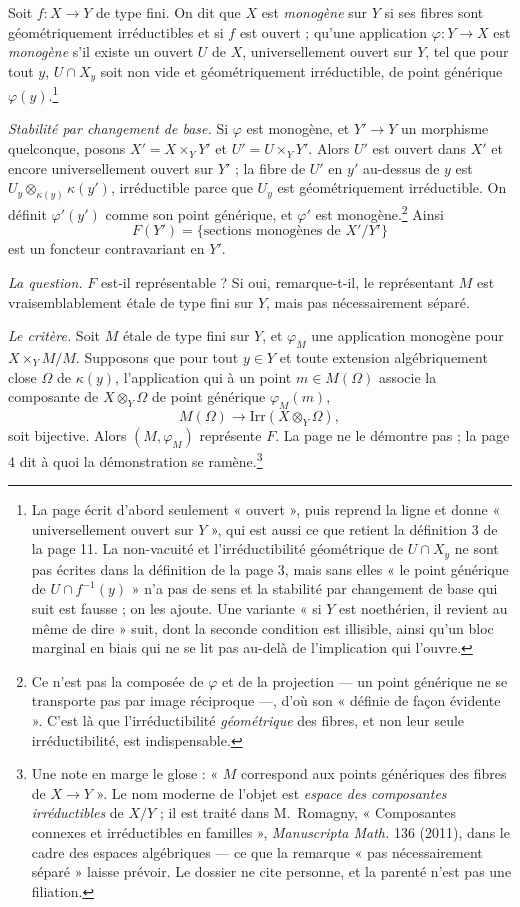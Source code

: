 \documentclass[11pt,a4paper]{article}
\begin{document}
Soit $f : X \to Y$ de type fini. On dit que $X$ est \emph{monogène} sur $Y$ si
ses fibres sont géométriquement irréductibles et si $f$ est ouvert ; qu'une
application $\varphi : Y \to X$ est \emph{monogène} s'il existe un ouvert $U$
de $X$, universellement ouvert sur $Y$, tel que pour tout $y$, $U \cap X_y$
soit non vide et géométriquement irréductible, de point générique
$\varphi(y)$.\footnote{La page écrit d'abord seulement « ouvert », puis reprend
la ligne et donne « universellement ouvert sur $Y$ », qui est aussi ce que
retient la définition 3 de la page 11. La non-vacuité et l'irréductibilité
géométrique de $U \cap X_y$ ne sont pas écrites dans la définition de la page
3, mais sans elles « le point générique de $U \cap f^{-1}(y)$ » n'a pas de sens
et la stabilité par changement de base qui suit est fausse ; on les ajoute.
Une variante « si $Y$ est noethérien, il revient au même de dire » suit, dont
la seconde condition est illisible, ainsi qu'un bloc marginal en biais qui ne
se lit pas au-delà de l'implication qui l'ouvre.}

\emph{Stabilité par changement de base.} Si $\varphi$ est monogène, et
$Y' \to Y$ un morphisme quelconque, posons $X' = X \times_Y Y'$ et
$U' = U \times_Y Y'$. Alors $U'$ est ouvert dans $X'$ et encore universellement
ouvert sur $Y'$ ; la fibre de $U'$ en $y'$ au-dessus de $y$ est
$U_y \otimes_{\kappa(y)} \kappa(y')$, irréductible parce que $U_y$ est
géométriquement irréductible. On définit $\varphi'(y')$ comme son point
générique, et $\varphi'$ est monogène.\footnote{Ce n'est pas la composée de
$\varphi$ et de la projection --- un point générique ne se transporte pas par
image réciproque ---, d'où son « définie de façon évidente ». C'est là que
l'irréductibilité \emph{géométrique} des fibres, et non leur seule
irréductibilité, est indispensable.} Ainsi
\[
  F(Y') = \{\text{sections monogènes de } X' / Y'\}
\]
est un foncteur contravariant en $Y'$.

\emph{La question.} $F$ est-il représentable ? Si oui, remarque-t-il, le
représentant $M$ est vraisemblablement étale de type fini sur $Y$, mais pas
nécessairement séparé.

\emph{Le critère.} Soit $M$ étale de type fini sur $Y$, et $\varphi_M$ une
application monogène pour $X \times_Y M / M$. Supposons que pour tout $y \in Y$
et toute extension algébriquement close $\Omega$ de $\kappa(y)$, l'application
qui à un point $m \in M(\Omega)$ associe la composante de $X \otimes_Y \Omega$
de point générique $\varphi_M(m)$,
\[
  M(\Omega) \longrightarrow \mathrm{Irr}(X \otimes_Y \Omega),
\]
soit bijective. Alors $(M, \varphi_M)$ représente $F$. La page ne le démontre
pas ; la page 4 dit à quoi la démonstration se ramène.\footnote{Une note en
marge le glose : « $M$ correspond aux points génériques des fibres de
$X \to Y$ ». Le nom moderne de l'objet est \emph{espace des composantes
irréductibles} de $X/Y$ ; il est traité dans M.~Romagny, « Composantes
connexes et irréductibles en familles », \emph{Manuscripta Math.} 136 (2011),
dans le cadre des espaces algébriques --- ce que la remarque « pas
nécessairement séparé » laisse prévoir. Le dossier ne cite personne, et la
parenté n'est pas une filiation.}
\end{document}
